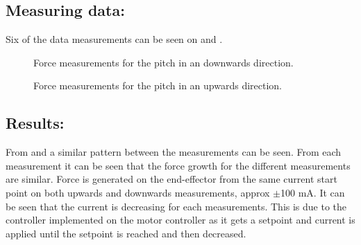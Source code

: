 \subsection*{Measuring data:}
Six of the data measurements can be seen on  and .

\begin{figure}[H]
\centering

\caption{Force measurements for the pitch in an downwards direction.}
\label{fig:pitch_down}
\end{figure}

\begin{figure}[H]
\centering

\caption{Force measurements for the pitch in an upwards direction.}
\label{fig:pitch_up}
\end{figure}





\subsection*{Results:}
From  and  a similar pattern between the measurements can be seen. From each measurement it can be seen that the force growth for the different measurements are similar. Force is generated on the end-effector from the same current start point on both upwards and downwards measurements, approx $\pm$100 mA. It can be seen that the current is decreasing for each measurements. This is due to the controller implemented on the motor controller as it gets a setpoint and current is applied until the setpoint is reached and then decreased.


%
